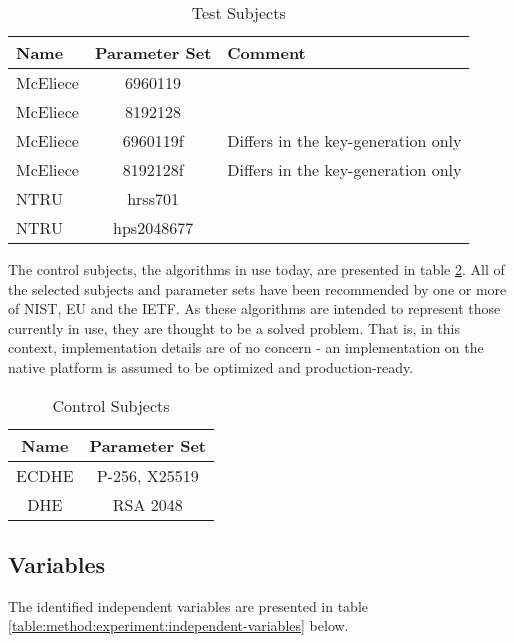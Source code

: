 
\begin{table}[H]
    \centering
    \begin{tabular}{l|c|p{4cm}}
        Name & Parameter Set & Comment \\
        \hline
        McEliece & 6960119 & \\
        McEliece & 8192128 & \\
        McEliece & 6960119f & Differs in the key-generation only \\
        McEliece & 8192128f & Differs in the key-generation only\\
        NTRU & hrss701 & \\
        NTRU & hps2048677 & \\
    \end{tabular}
    \caption{Test Subjects}
    \label{table:method:experiment:test-subjects}
\end{table}

The control subjects, the algorithms in use today, are presented in table \ref{table:method:experiment:control-subjects}. All of the selected subjects and parameter sets have been recommended by one or more of NIST, EU and the IETF. As these algorithms are intended to represent those currently in use, they are thought to be a solved problem. That is, in this context, implementation details are of no concern - an implementation on the native platform is assumed to be optimized and production-ready.

\begin{table}[H]
    \centering
    \begin{tabular}{c|c}
        Name & Parameter Set \\
        \hline
        ECDHE & P-256, X25519 \\
        DHE & RSA 2048 \\
    \end{tabular}
    \caption{Control Subjects}
    \label{table:method:experiment:control-subjects}
\end{table}

\subsection{Variables}

The identified independent variables are presented in table \ref{table:method:experiment:independent-variables} below.

